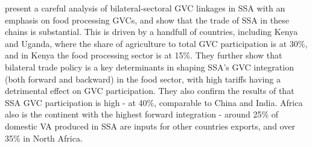 \documentclass[a4paper]{article}
\begin{document}
\citet{balie2019does} present a careful analysis of bilateral-sectoral GVC linkages in SSA with an emphasis on food processing GVCs, and show that the trade of SSA in these chains is substantial. This is driven by a handfull of countries, including Kenya and Uganda, where the share of agriculture to total GVC participation is at 30\%, and in Kenya the food processing sector is at 15\%. They further show that bilateral trade policy is a key determinants in shaping SSA's GVC integration (both forward and backward) in the food sector, with high tariffs having a detrimental effect on GVC participation. They also confirm the results of \citet{foster2015global} that SSA GVC participation is high - at 40\%, comparable to China and India. Africa also is the continent with the highest forward integration - around 25\% of domestic VA produced in SSA are inputs for other countries exports, and over 35\% in North Africa.\newline

\end{document}
